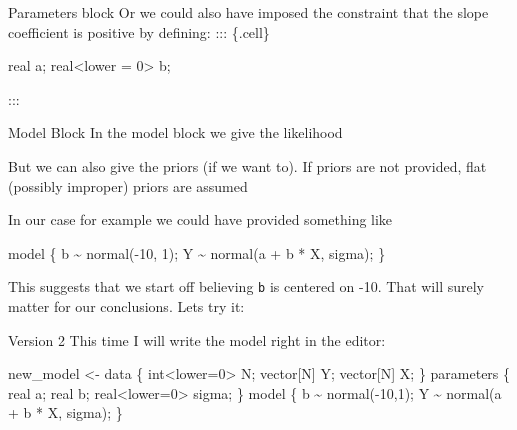 \documentclass[
  11pt,
  ignorenonframetext,
]{beamer}
\newenvironment{Shaded}{\begin{snugshade}}{\end{snugshade}}
\newcommand{\DecValTok}[1]{\textcolor[rgb]{0.68,0.00,0.00}{#1}}
\newcommand{\FunctionTok}[1]{\textcolor[rgb]{0.28,0.35,0.67}{#1}}
\newcommand{\NormalTok}[1]{\textcolor[rgb]{0.00,0.23,0.31}{#1}}
\newcommand{\OtherTok}[1]{\textcolor[rgb]{0.00,0.23,0.31}{#1}}
\newcommand{\SpecialCharTok}[1]{\textcolor[rgb]{0.37,0.37,0.37}{#1}}
\newcommand{\StringTok}[1]{\textcolor[rgb]{0.13,0.47,0.30}{#1}}
\begin{document}
\begin{frame}[fragile]{Parameters block}
\protect\hypertarget{parameters-block-2}{}
Or we could also have imposed the constraint that the slope coefficient
is positive by defining: ::: \{.cell\}

\begin{Shaded}
\begin{Highlighting}[]
\NormalTok{real a;}
\NormalTok{real}\SpecialCharTok{\textless{}}\NormalTok{lower }\OtherTok{=} \DecValTok{0}\SpecialCharTok{\textgreater{}}\NormalTok{ b;}
\end{Highlighting}
\end{Shaded}

:::
\end{frame}

\begin{frame}[fragile]{Model Block}
\protect\hypertarget{model-block}{}
In the model block we give the likelihood

But we can also give the priors (if we want to). If priors are not
provided, flat (possibly improper) priors are assumed

In our case for example we could have provided something like

\begin{Shaded}
\begin{Highlighting}[]
\NormalTok{model \{}
\NormalTok{  b }\SpecialCharTok{\textasciitilde{}} \FunctionTok{normal}\NormalTok{(}\SpecialCharTok{{-}}\DecValTok{10}\NormalTok{, }\DecValTok{1}\NormalTok{);}
\NormalTok{  Y }\SpecialCharTok{\textasciitilde{}} \FunctionTok{normal}\NormalTok{(a }\SpecialCharTok{+}\NormalTok{ b }\SpecialCharTok{*}\NormalTok{ X, sigma);}
\NormalTok{\}}
\end{Highlighting}
\end{Shaded}

This suggests that we start off believing \texttt{b} is centered on -10.
That will surely matter for our conclusions. Lets try it:
\end{frame}

\begin{frame}[fragile]{Version 2}
\protect\hypertarget{version-2}{}
This time I will write the model right in the editor:

\begin{Shaded}
\begin{Highlighting}[]
\NormalTok{new\_model }\OtherTok{\textless{}{-}} \StringTok{\textquotesingle{}}
\StringTok{data \{}
\StringTok{  int\textless{}lower=0\textgreater{} N;}
\StringTok{  vector[N] Y;}
\StringTok{  vector[N] X;}
\StringTok{\}}
\StringTok{parameters \{}
\StringTok{  real a;}
\StringTok{  real b;}
\StringTok{  real\textless{}lower=0\textgreater{} sigma;}
\StringTok{\}}
\StringTok{model \{}
\StringTok{  b \textasciitilde{} normal({-}10,1);}
\StringTok{  Y \textasciitilde{} normal(a + b * X, sigma);}
\StringTok{\}}
\StringTok{\textquotesingle{}}
\end{Highlighting}
\end{Shaded}
\end{frame}
\end{document}
